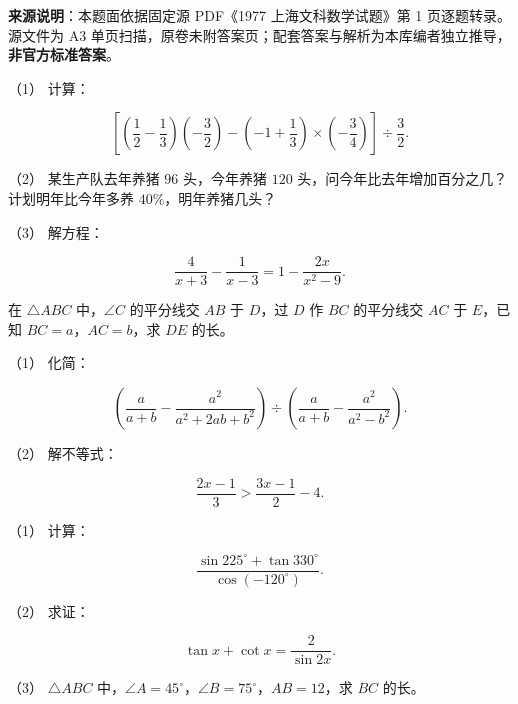 

\begin{gktip}
\textbf{来源说明}：本题面依据固定源 PDF《1977 上海文科数学试题》第 1 页逐题转录。源文件为 A3 单页扫描，原卷未附答案页；配套答案与解析为本库编者独立推导，\textbf{非官方标准答案}。
\end{gktip}

\par\medskip

\begin{question}

（1） 计算：

\nopagebreak[4]
\[
\left[\left(\frac12-\frac13\right)\left(-\frac32\right)-\left(-1+\frac13\right)\times\left(-\frac34\right)\right]\div\frac32.
\]

（2） 某生产队去年养猪 $96$ 头，今年养猪 $120$ 头，问今年比去年增加百分之几？计划明年比今年多养 $40\%$，明年养猪几头？

（3） 解方程：

\nopagebreak[4]
\[
\frac{4}{x+3}-\frac{1}{x-3}=1-\frac{2x}{x^2-9}.
\]

\Needspace{0.4\textheight}
\end{question}
\begin{question}
在 $\triangle ABC$ 中，$\angle C$ 的平分线交 $AB$ 于 $D$，过 $D$ 作 $BC$ 的平分线交 $AC$ 于 $E$，已知 $BC=a$，$AC=b$，求 $DE$ 的长。
\nopagebreak[4]
\begin{center}\end{center}
\nopagebreak[4]
\end{question}
\begin{question}

（1） 化简：

\nopagebreak[4]
\[
\left(\frac{a}{a+b}-\frac{a^2}{a^2+2ab+b^2}\right)\div\left(\frac{a}{a+b}-\frac{a^2}{a^2-b^2}\right).
\]

（2） 解不等式：

\nopagebreak[4]
\[
\frac{2x-1}{3}>\frac{3x-1}{2}-4.
\]

\end{question}
\begin{question}

（1） 计算：

\nopagebreak[4]
\[
\frac{\sin225^\circ+\tan330^\circ}{\cos(-120^\circ)}.
\]

（2） 求证：

\nopagebreak[4]
\[
\tan x+\cot x=\frac{2}{\sin2x}.
\]

（3） $\triangle ABC$ 中，$\angle A=45^\circ$，$\angle B=75^\circ$，$AB=12$，求 $BC$ 的长。

\Needspace{0.4\textheight}
\end{question}
